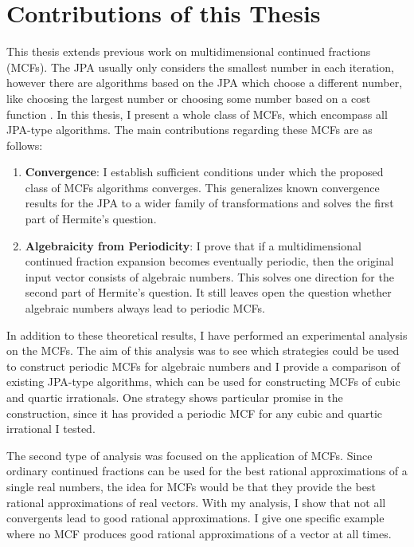 \section{Contributions of this Thesis}
\label{sec:contributions}

This thesis extends previous work on multidimensional continued fractions (MCFs).
The JPA usually only considers the smallest number in each iteration,
however there are algorithms based on the JPA which choose a different number,
like choosing the largest number \cite{Podsypanin77} or choosing some number
based on a cost function \cite{Tamura09}.
In this thesis, I present a whole class of MCFs,
which encompass all JPA-type algorithms.
The main contributions regarding these MCFs are as follows:
\begin{enumerate}
  \item \textbf{Convergence}:
    I establish sufficient conditions under which the proposed class of MCFs
    algorithms converges.
    This generalizes known convergence results for the JPA to a wider family of
    transformations and solves the first part of Hermite's question.
  \item \textbf{Algebraicity from Periodicity}:
    I prove that if a multidimensional continued fraction expansion becomes
    eventually periodic, then the original input vector consists of algebraic
    numbers.
    This solves one direction for the second part of Hermite's question.
    It still leaves open the question whether algebraic numbers always lead to
    periodic MCFs.
\end{enumerate}

In addition to these theoretical results,
I have performed an experimental analysis on the MCFs.
The aim of this analysis was to see which strategies could be used
to construct periodic MCFs for algebraic numbers
and I provide a comparison of existing JPA-type algorithms,
which can be used for constructing MCFs of cubic and quartic irrationals.
One strategy shows particular promise in the construction,
since it has provided a periodic MCF for any cubic and quartic irrational I tested.

The second type of analysis was focused on the application of MCFs.
Since ordinary continued fractions can be used for the best rational approximations
of a single real numbers, the idea for MCFs would be that they provide the best
rational approximations of real vectors.
With my analysis, I show that not all convergents lead to good rational approximations.
I give one specific example where no MCF produces good rational
approximations of a vector at all times.

